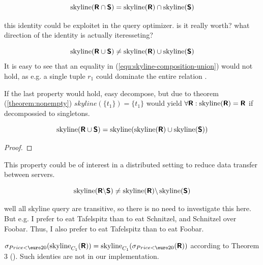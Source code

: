 \begin{equation}
\skyline(\relation{R} \intersection \relation{S}) = \skyline(\relation{R}) \intersection \skyline(\relation{S})
\end{equation}

this identity could be exploitet in the query optimizer. 
is it really worth? what direction of the identity is actually iteresseting?

\begin{equation}\label{equ:skyline-composition-union}
\skyline(\relation{R} \union \relation{S}) \not= \skyline(\relation{R}) \union \skyline(\relation{S})
\end{equation}
It is easy to see that an equality in (\ref{equ:skyline-composition-union}) would not hold, as e.g. a single tuple $r_1$ could dominate the entire relation .

If the last property would hold, easy decompose, but due to theorem (\ref{theorem:nonempty}) $skyline(\{t_1\}) = \{t_1\}$ would yield $\forall \relation{R} : \skyline(\relation{R}) = \relation{R}$ if decompossied to singletons.

\begin{equation}\label{equ:skyline-decompose}
\skyline(\relation{R} \union \relation{S}) = \skyline(\skyline(\relation R) \union \skyline(\relation S))
\end{equation}
\begin{proof}
\end{proof}

This property could be of interest in a distributed setting to reduce data transfer between servers.


\begin{equation}
\skyline(\relation{R} \difference \relation{S}) \not= \skyline(\relation{R}) \difference \skyline(\relation{S})
\end{equation}


well all skyline query are transitive, so there is no need to investigate this here. But e.g. I prefer to eat Tafelspitz than to eat Schnitzel, and Schnitzel over Foobar. Thus, I also prefer to eat Tafelspitz than to eat Foobar.


$\sigma_{Price<\textnormal{\euro}20}(\skyline_{C_1}(\relation{R}))=\skyline_{C_1}(\sigma_{Price<\textnormal{\euro}20}(\relation{R}))$
according to Theorem 3 (\citep{Chomicki2002}).
Such identies are not in our implementation.

